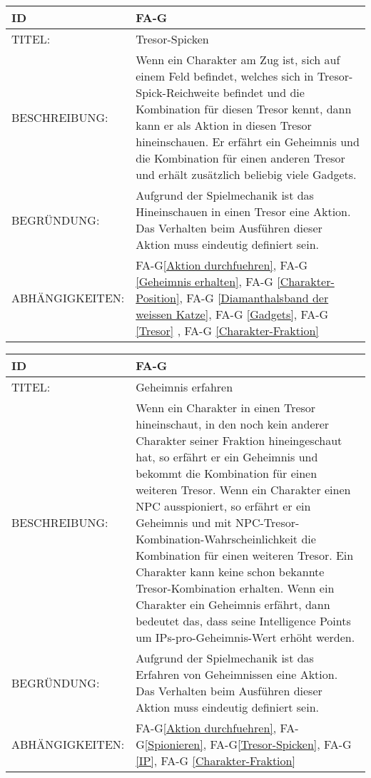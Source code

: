 \begin{tabularx}{16cm}{l|X}
	{table}\label{Tresor-Spicken}
	\textbf{ID} & \textbf{FA-G\arabic{table}} \\
	\hline
	TITEL: & Tresor-Spicken \\
	\hline
	BESCHREIBUNG: & Wenn ein Charakter am Zug ist, sich auf einem Feld befindet, welches sich in Tresor-Spick-Reichweite befindet und die Kombination für diesen Tresor kennt, dann kann er als Aktion in diesen Tresor hineinschauen. Er erfährt ein Geheimnis und die Kombination für einen anderen Tresor und erhält zusätzlich beliebig viele Gadgets.\\
	 
	\hline
	BEGRÜNDUNG: & Aufgrund der Spielmechanik ist das Hineinschauen in einen Tresor eine Aktion. Das Verhalten beim Ausführen dieser Aktion muss eindeutig definiert sein.\\
	\hline
	ABHÄNGIGKEITEN: & FA-G\ref{Aktion durchfuehren}, FA-G \ref{Geheimnis erhalten}, FA-G \ref{Charakter-Position}, FA-G \ref{Diamanthalsband der weissen Katze}, FA-G \ref{Gadgets}, FA-G \ref{Tresor} , FA-G \ref{Charakter-Fraktion} \\
\end{tabularx}

\begin{tabularx}{16cm}{l|X}
	{table}\label{Geheimnis erhalten}
	\textbf{ID} & \textbf{FA-G\arabic{table}} \\
	\hline
	TITEL: & Geheimnis erfahren \\
	\hline
	BESCHREIBUNG: & Wenn ein Charakter in einen Tresor hineinschaut, in den noch kein anderer Charakter seiner Fraktion hineingeschaut hat, so erfährt er ein Geheimnis und bekommt die Kombination für einen weiteren Tresor. Wenn ein Charakter einen NPC ausspioniert, so erfährt er ein Geheimnis und mit NPC-Tresor-Kombination-Wahrscheinlichkeit die Kombination für einen weiteren Tresor. Ein Charakter kann keine schon bekannte Tresor-Kombination erhalten. Wenn ein Charakter ein Geheimnis erfährt, dann bedeutet das, dass seine Intelligence Points um IPs-pro-Geheimnis-Wert erhöht werden. \\
	 
	\hline
	BEGRÜNDUNG: & Aufgrund der Spielmechanik ist das Erfahren von Geheimnissen eine Aktion. Das Verhalten beim Ausführen dieser Aktion muss eindeutig definiert sein.\\
	\hline

	ABHÄNGIGKEITEN: & FA-G\ref{Aktion durchfuehren}, FA-G\ref{Spionieren}, FA-G\ref{Tresor-Spicken}, FA-G \ref{IP}, FA-G \ref{Charakter-Fraktion} \\
\end{tabularx}


